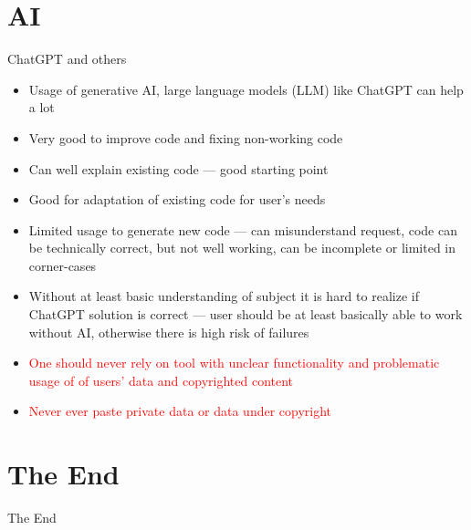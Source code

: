 \documentclass[compress, xelatex, 11pt, xcolor=svgnames, aspectratio=169, url={hyphens, lowtilde}]{beamer}
\renewcommand{\alert}[1]{\textcolor{red}{#1}}
\begin{document}
\section{AI}

\begin{frame}{ChatGPT and others}
	\begin{itemize}
		\item Usage of generative AI, large language models (LLM) like ChatGPT can help a lot
		\item Very good to improve code and fixing non-working code
		\item Can well explain existing code --- good starting point
		\item Good for adaptation of existing code for user's needs
		\item Limited usage to generate new code --- can misunderstand request, code can be technically correct, but not well working, can be incomplete or limited in corner-cases
		\item Without at least basic understanding of subject it is hard to realize if ChatGPT solution is correct --- user should be at least basically able to work without AI, otherwise there is high risk of failures
		\item \alert{One should never rely on tool with unclear functionality and problematic usage of of users' data and copyrighted content}
		\item \alert{Never ever paste private data or data under copyright}
	\end{itemize}
\end{frame}

%

\section{The End}

\begin{frame}{The End}
	\tableofcontents[currentsection, sectionstyle=show/hide, hideothersubsections]
\end{frame}
\end{document}
